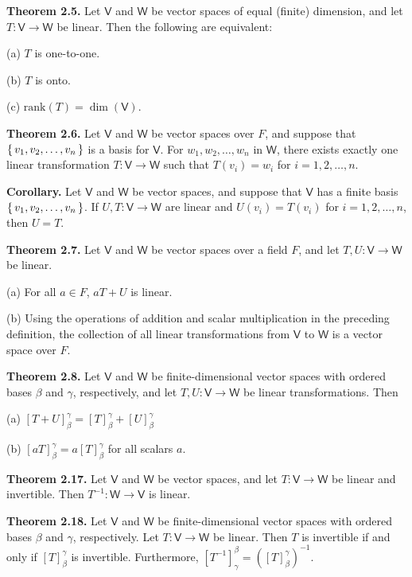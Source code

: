 \documentclass{article}
\newcommand{\0}{\mathit{0}}
\begin{document}
\medskip

\textbf{Theorem 2.5.} Let $\mathsf{V}$ and $\mathsf{W}$ be vector spaces of equal (finite)
dimension, and let $T: \mathsf{V} \to \mathsf{W}$ be linear. Then the following are equivalent:

(a) $T$ is one-to-one.

(b) $T$ is onto.

(c) $\mathrm{rank}(T) = \dim(\mathsf{V})$.

\medskip

\textbf{Theorem 2.6.} Let $\mathsf{V}$ and $\mathsf{W}$ be vector spaces over $F$, and suppose that
$\set{v_1, v_2, \dots, v_n}$ is a basis for $\mathsf{V}$.
For $w_1, w_2, \dots, w_n$ in $\mathsf{W}$, there exists exactly one linear transformation
$T: \mathsf{V} \to \mathsf{W}$ such that $T(v_i) = w_i$ for $i = 1, 2, \dots, n$.

\medskip

\textbf{Corollary.} Let $\mathsf{V}$ and $\mathsf{W}$ be vector spaces, and suppose that
$\mathsf{V}$ has a finite basis $\set{v_1, v_2, \dots, v_n}$.
If $U, T: \mathsf{V} \to \mathsf{W}$ are linear and $U(v_i) = T(v_i)$ for
$i = 1, 2, \dots, n$, then $U = T$.

\medskip

\textbf{Theorem 2.7.} Let $\mathsf{V}$ and $\mathsf{W}$ be vector spaces over a field $F$,
and let $T, U: \mathsf{V} \to \mathsf{W}$ be linear.

(a) For all $a \in F$, $aT + U$ is linear.

(b) Using the operations of addition and scalar multiplication in the preceding
definition, the collection of all linear transformations from $\mathsf{V}$ to
$\mathsf{W}$ is a vector space over $F$.

\medskip

\textbf{Theorem 2.8.} Let $\mathsf{V}$ and $\mathsf{W}$ be finite-dimensional vector spaces
with ordered bases $\beta$ and $\gamma$, respectively, and let $T, U: \mathsf{V} \to \mathsf{W}$
be linear transformations. Then

(a) $\left[ T + U \right]^\gamma_\beta = \left[ T \right]^\gamma_\beta + \left[ U \right]^\gamma_\beta$

(b) $\left[ aT \right]^\gamma_\beta = a \left[ T \right]^\gamma_\beta$ for all scalars $a$.

\medskip

\textbf{Theorem 2.17.} Let $\mathsf{V}$ and $\mathsf{W}$ be vector spaces, and let
$T: \mathsf{V} \to \mathsf{W}$ be linear and invertible.
Then $T^{-1}: \mathsf{W} \to \mathsf{V}$ is linear.

\medskip

\textbf{Theorem 2.18.} Let $\mathsf{V}$ and $\mathsf{W}$ be finite-dimensional vector spaces
with ordered bases $\beta$ and $\gamma$, respectively. Let
$T: \mathsf{V} \to \mathsf{W}$ be linear.
Then $T$ is invertible if and only if $\left[ T \right]^\gamma_\beta$ is invertible.
Furthermore,
\(
\left[ T^{-1} \right]^\beta_\gamma = \left( \left[ T \right]^\gamma_\beta \right)^{-1}.
\)
\end{document}
